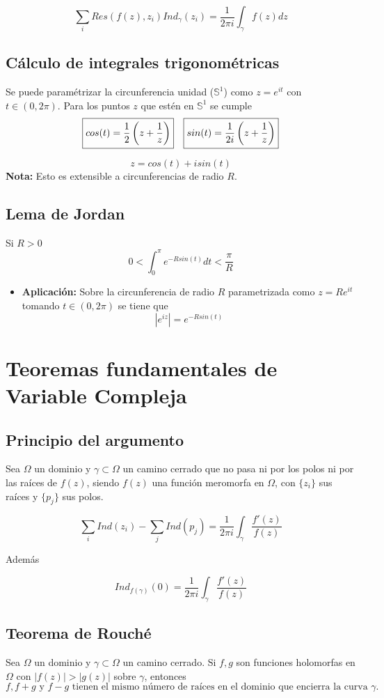 \documentclass[paper=a4, fontsize=11pt]{scrartcl}
\numberwithin{equation}{section}
\numberwithin{figure}{section}
\numberwithin{table}{section}
\begin{document}
$$\boxed{\sum_i Res\left(f(z), z_i\right)Ind_\gamma(z_i) = \frac{1}{2\pi i}\int_\gamma f(z)dz}$$


\subsection{Cálculo de integrales trigonométricas}
Se puede paramétrizar la circunferencia unidad ($\mathbb{S}^1$) como $z=e^{it}$ con $t\in (0,2\pi)$.
Para los puntos $z$ que estén en $\mathbb{S}^1$ se cumple
$$
\begin{array}{l r}
\boxed{cos(t) = \frac{1}{2}\left(z+\frac{1}{z}\right)} & \boxed{sin(t) = \frac{1}{2i}\left(z+\frac{1}{z}\right)}
\end{array}
$$

$$\boxed{z = cos(t)+isin(t)}$$
\textbf{Nota: } Esto es extensible a circunferencias de radio $R$.
\subsection{Lema de Jordan}
Si $R>0$
$$\boxed{0<\int_0^\pi e^{-Rsin(t)}dt < \frac{\pi}{R}}$$

\begin{itemize}
\item \textbf{Aplicación:} Sobre la circunferencia de radio $R$ parametrizada como $z=Re^{it}$ tomando $t\in (0,2\pi)$ se tiene que
$$\boxed{\left|e^{iz}\right|=e^{-Rsin(t)}}$$
\end{itemize}

\newpage
\section{Teoremas fundamentales de Variable Compleja}

\subsection{Principio del argumento}
Sea $\Omega$ un dominio y $\gamma\subset\Omega$ un camino cerrado que no pasa ni por los polos ni por las raíces de $f(z)$, siendo $f(z)$ una función meromorfa en $\Omega$, con $\{z_i\}$ sus raíces y $\{p_j\}$ sus polos.

$$\sum_i Ind(z_i) - \sum_j Ind(p_j)= \frac{1}{2\pi i}\int_\gamma \frac{f'(z)}{f(z)}$$

Además

$$Ind_{f(\gamma)}(0) = \frac{1}{2\pi i}\int_\gamma \frac{f'(z)}{f(z)}$$

\subsection{Teorema de Rouché}
Sea $\Omega$ un dominio y $\gamma\subset\Omega$ un camino cerrado. Si $f,g$ son funciones holomorfas en $\Omega$ con $|f(z)|>|g(z)|$ sobre $\gamma$, entonces
$$f, f+g \text{ y } f-g \text{ tienen el mismo número de raíces en el dominio que encierra la curva } \gamma.$$
\end{document}
